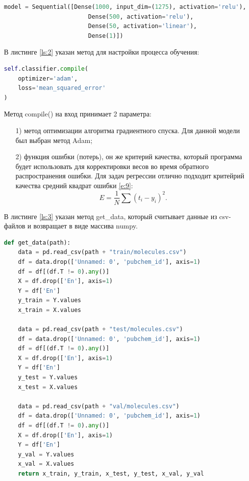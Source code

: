 \begin{lstlisting}[caption={Описание модели нейросети},language=python, label={ls:1}]
model = Sequential([Dense(1000, input_dim=(1275), activation='relu'),
                        Dense(500, activation='relu'),
                        Dense(50, activation='linear'),
                        Dense(1)])
\end{lstlisting}

В листинге \ref{ls:2} указан метод для настройки процесса обучения:

\begin{lstlisting}[caption={Использовние метода compile()},language=python,label={ls:2}]
self.classifier.compile(
    optimizer='adam', 
    loss='mean_squared_error'
)
\end{lstlisting}
Метод compile() на вход принимает 2 параметра:
\begin{enumerate} 
  \item[1)] метод оптимизации алгоритма градиентного спуска. Для данной модели был выбран метод Adam;
  \item[2)] функция ошибки (потерь), он же критерий качества, который программа будет использовать для корректировки весов во время обратного распространения ошибки. Для задач регрессии отлично подходит критейрий качества средний квадрат ошибки \ref{e:9}:
\begin{equation} \label{e:9}
 E = \frac{1}{N}\sum (t_{i}-y_{i})^2.
\end{equation}
\end{enumerate}

В листинге \ref{ls:3} указан метод get\_data, который считывает данные из csv-файлов и возвращает в виде массива numpy.
\begin{lstlisting}[caption={Определение метода get\_data},language=python,label={ls:3}]
def get_data(path):
    data = pd.read_csv(path + "train/molecules.csv")
    df = data.drop(['Unnamed: 0', 'pubchem_id'], axis=1)
    df = df[(df.T != 0).any()]
    X = df.drop(['En'], axis=1)
    Y = df['En']
    y_train = Y.values
    x_train = X.values

    data = pd.read_csv(path + "test/molecules.csv")
    df = data.drop(['Unnamed: 0', 'pubchem_id'], axis=1)
    df = df[(df.T != 0).any()]
    X = df.drop(['En'], axis=1)
    Y = df['En']
    y_test = Y.values
    x_test = X.values

    data = pd.read_csv(path + "val/molecules.csv")
    df = data.drop(['Unnamed: 0', 'pubchem_id'], axis=1)
    df = df[(df.T != 0).any()]
    X = df.drop(['En'], axis=1)
    Y = df['En']
    y_val = Y.values
    x_val = X.values
    return x_train, y_train, x_test, y_test, x_val, y_val
\end{lstlisting}

